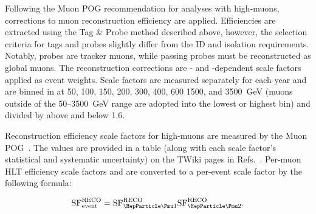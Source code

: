 Following the Muon POG recommendation for analyses with high-\pt muons, corrections to muon reconstruction efficiency are applied. Efficiencies are extracted using the Tag \& Probe method described above, however, the selection criteria for tags and probes slightly differ from the ID and isolation requirements. Notably, probes are tracker muons, while passing probes must be reconstructed as global muons. The reconstruction corrections are \mom- and \pseudorap-dependent scale factors applied as event weights. Scale factors are measured separately for each year and are binned in \pt at 50, 100, 150, 200, 300, 400, 600 1500, and \SI{3500}{\GeV} (muons outside of the 50--\SI{3500}{\GeV} range are adopted into the lowest or highest bin) and divided by \abspseudorap above and below 1.6.

Reconstruction efficiency scale factors for high-\pt muons are measured by the Muon POG~\cite{MUO-17-001}\cite{AN-18-008}. The values are provided in a table (along with each scale factor's statistical and systematic uncertainty) on the TWiki pages in Refs.~\cite{MuonTwiki2016}\cite{MuonTwiki2017}\cite{MuonTwiki2018}. Per-muon HLT efficiency scale factors  and  are converted to a per-event scale factor  by the following formula:

\begin{equation}
  \SF{RECO}{event} = \SF{RECO}{\PmuOne} \SF{RECO}{\PmuTwo}.
\end{equation}